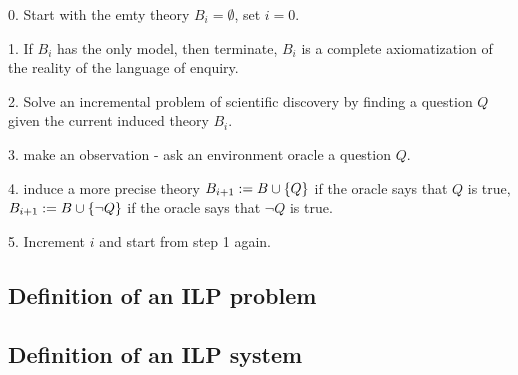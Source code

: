 0. Start with the emty theory $B_i=\emptyset$, set $i=0$.

1. If $B_i$ has the only model, then terminate, $B_i$ is a complete axiomatization of the reality of the language of enquiry.

2. Solve an incremental problem of scientific discovery by finding a question $Q$ given the current induced theory $B_i$.

3. make an observation - ask an environment oracle a question $Q$.

4. induce a more precise theory $B_{i+1}:=B \cup \{Q\}$ if the oracle says that $Q$ is true, $B_{i+1}:=B \cup \{\neg Q\}$ if the oracle says that $\neg Q$ is true.

5. Increment $i$ and start from step 1 again.

\subsection{Definition of an ILP problem}

\subsection{Definition of an ILP system}